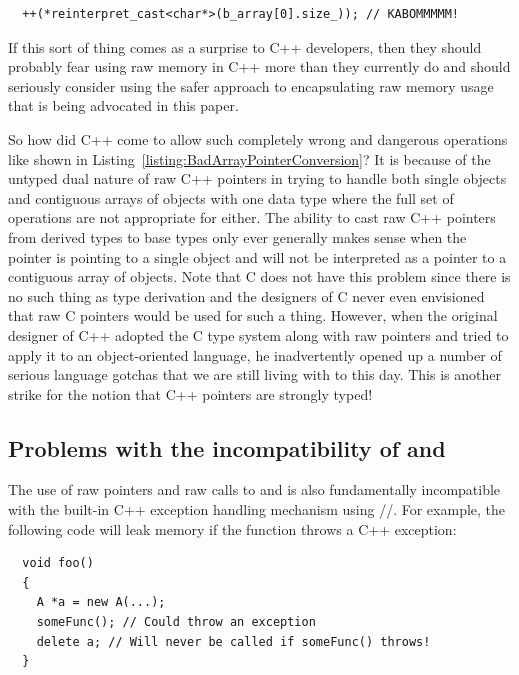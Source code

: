 \documentclass[pdf,ps2pdf,11pt]{SANDreport}
\begin{document}
{\small\begin{verbatim}
  ++(*reinterpret_cast<char*>(b_array[0].size_)); // KABOMMMMM!
\end{verbatim}}

If this sort of thing comes as a surprise to C++ developers, then they
should probably fear using raw memory in C++ more than they currently
do and should seriously consider using the safer approach to
encapsulating raw memory usage that is being advocated in this paper.

So how did C++ come to allow such completely wrong and dangerous
operations like shown in
Listing~\ref{listing:BadArrayPointerConversion}?  It is because of the
untyped dual nature of raw C++ pointers in trying to handle both
single objects and contiguous arrays of objects with one data type
where the full set of operations are not appropriate for either.  The
ability to cast raw C++ pointers from derived types to base types only
ever generally makes sense when the pointer is pointing to a single
object and will not be interpreted as a pointer to a contiguous array
of objects.  Note that C does not have this problem since there is no
such thing as type derivation and the designers of C never even
envisioned that raw C pointers would be used for such a thing.
However, when the original designer of C++ adopted the C type system
along with raw pointers and tried to apply it to an object-oriented
language, he inadvertently opened up a number of serious language
gotchas that we are still living with to this day.  This is another
strike for the notion that C++ pointers are strongly typed!


%
{}\subsection{Problems with the incompatibility of
{} and {}}
%

The use of raw pointers and raw calls to {} and
{} is also fundamentally incompatible with the built-in
C++ exception handling mechanism using
{}/{}/{}.  For example, the following
code will leak memory if the function {} throws a C++
exception:

{\small\begin{verbatim}
  void foo()
  {
    A *a = new A(...);
    someFunc(); // Could throw an exception
    delete a; // Will never be called if someFunc() throws!
  }
\end{verbatim}}
\end{document}

